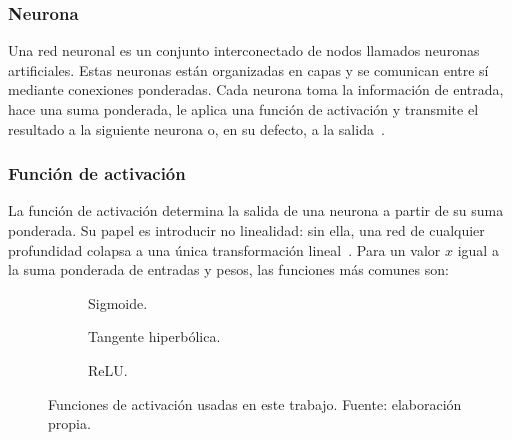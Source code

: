 \documentclass[titlepage,11pt]{article}
\begin{document}
\subsubsection{Neurona}
Una red neuronal es un conjunto interconectado de nodos llamados neuronas
artificiales. Estas neuronas están organizadas en capas y se comunican entre sí
mediante conexiones ponderadas. Cada neurona toma la información de entrada,
hace una suma ponderada, le aplica una función de activación y transmite el
resultado a la siguiente neurona o, en su defecto, a la
salida~\cite{antonio_2023_introduccin,ibm_qu,santana_2018_1,santana_2018_2,santana_2018_3,santana_2018_3_5}.

\subsubsection{Función de activación}
La función de activación determina la salida de una neurona a partir de su suma
ponderada. Su papel es introducir no linealidad: sin ella, una red de cualquier
profundidad colapsa a una única transformación
lineal~\cite{wikipediacontributors_2018_activation}. Para un valor $x$ igual a
la suma ponderada de entradas y pesos, las funciones más comunes son:

\begin{figure}
  \centering
  \begin{subfigure}[b]{0.31\linewidth}
    \centering
    \caption{Sigmoide.}
    \label{fig:sigmoide}
  \end{subfigure}\hfill
  \begin{subfigure}[b]{0.31\linewidth}
    \centering
    \caption{Tangente hiperbólica.}
    \label{fig:tanh}
  \end{subfigure}\hfill
  \begin{subfigure}[b]{0.31\linewidth}
    \centering
    \caption{ReLU.}
    \label{fig:relu}
  \end{subfigure}
  \caption{Funciones de activación usadas en este trabajo. Fuente: elaboración
    propia.}
  \label{fig:activacion}
\end{figure}
\end{document}
